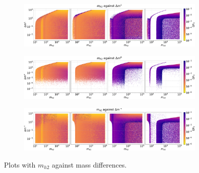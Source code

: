 \documentclass[12pt]{article}
\begin{document}
\begin{figure}[H]
    \begin{subfigure}[b]{\columnwidth}
      \centering
      \includegraphics[width=1\columnwidth]{4plot/MD2_DM2.pdf}
    \end{subfigure}
    
    \begin{subfigure}[b]{\columnwidth}
      \centering
      \includegraphics[width=1\columnwidth]{4plot/MD2_DM3.pdf}
    \end{subfigure}

    \begin{subfigure}[b]{\columnwidth}
      \centering
      \includegraphics[width=1\columnwidth]{4plot/MD2_DMP.pdf}
    \end{subfigure}
    \caption{Plots with $m_{h2}$ against mass differences.}
\end{figure}
\end{document}
